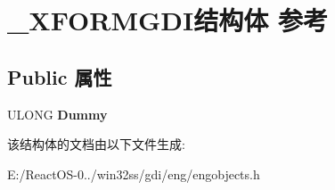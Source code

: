 \hypertarget{struct___x_f_o_r_m_g_d_i}{}\section{\+\_\+\+X\+F\+O\+R\+M\+G\+D\+I结构体 参考}
\label{struct___x_f_o_r_m_g_d_i}
\subsection*{Public 属性}
\begin{DoxyCompactItemize}
\item 
\mbox{\label{struct___x_f_o_r_m_g_d_i_a5e8f5f206d3d4bcc712d283551633cca}} 
U\+L\+O\+NG {\bfseries Dummy}
\end{DoxyCompactItemize}


该结构体的文档由以下文件生成\+:\begin{DoxyCompactItemize}
\item 
E\+:/\+React\+O\+S-\/0../win32ss/gdi/eng/engobjects.\+h\end{DoxyCompactItemize}
